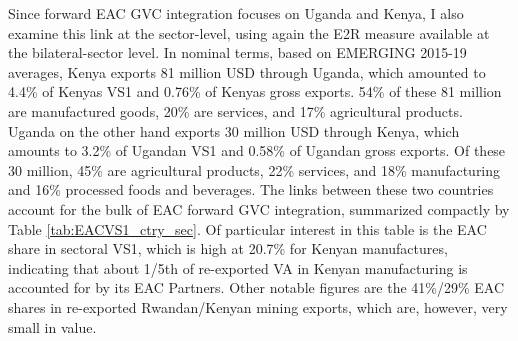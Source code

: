 \documentclass[a4paper]{article}
\begin{document}
Since forward EAC GVC integration focuses on Uganda and Kenya, I also examine this link at the sector-level, using again the E2R measure available at the bilateral-sector level. In nominal terms, based on EMERGING 2015-19 averages, Kenya exports 81 million USD through Uganda, which amounted to 4.4\% of Kenyas VS1 and 0.76\% of Kenyas gross exports. 54\% of these 81 million are manufactured goods, 20\% are services, and 17\% agricultural products. Uganda on the other hand exports 30 million USD through Kenya, which amounts to 3.2\% of Ugandan VS1 and 0.58\% of Ugandan gross exports. Of these 30 million, 45\% are agricultural products, 22\% services, and 18\% manufacturing and 16\% processed foods and beverages. The links between these two countries account for the bulk of EAC forward GVC integration, summarized compactly by Table \ref{tab:EACVS1_ctry_sec}. Of particular interest in this table is the EAC share in sectoral VS1, which is high at 20.7\% for Kenyan manufactures, indicating that about 1/5th of re-exported VA in Kenyan manufacturing is accounted for by its EAC Partners. Other notable figures are the 41\%/29\% EAC shares in re-exported Rwandan/Kenyan mining exports, which are, however, very small in value. 
\end{document}
